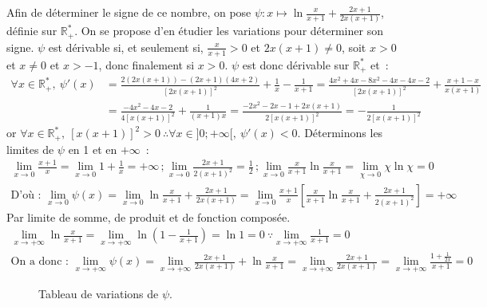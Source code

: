 \documentclass{article}
\begin{document}
  Afin de déterminer le signe de ce nombre, on pose $\psi:x\mapsto\ln\frac{x}{x+1}+\frac{2x+1}{2x(x+1)}$, définie sur $\mathbb{R}_+^*$. On se propose d'en étudier les variations pour déterminer son signe. $\psi$ est dérivable si, et seulement si, $\frac{x}{x+1}>0$ et $2x(x+1)\neq 0$, soit $x>0$ et $x\neq 0$ et $x>-1$, donc finalement si $x>0$. $\psi$ est donc dérivable sur $\mathbb{R}_+^*$ et~:
  \begin{align*}
    \forall x\in\mathbb{R}_+^*,\ \psi'(x)&=\frac{2(2x(x+1))-(2x+1)(4x+2)}{\left[2x(x+1)\right]^2}+\frac{1}{x}-\frac{1}{x+1}=\frac{4x^2+4x-8x^2-4x-4x-2}{\left[2x(x+1)\right]^2}+\frac{x+1-x}{x(x+1)} \\
    &=\frac{-4x^2-4x-2}{4\left[x(x+1)\right]^2}+\frac{1}{(x+1)x}=\frac{-2x^2-2x-1+2x(x+1)}{2\left[x(x+1)\right]^2}=-\frac{1}{2\left[x(x+1)\right]^2}
  \end{align*}
  or $\forall x\in\mathbb{R_+^*},\ \left[x(x+1)\right]^2>0\ \therefore \forall x\in]0;+\infty[,\ \psi'(x)<0$. Déterminons les limites de $\psi$ en 1 et en $+\infty$~:
  \begin{align*}
    \lim_{x\to 0}\frac{x+1}{x}=\lim_{x\to 0}1+\frac{1}{x}=+\infty\,; \lim_{x\to 0}\frac{2x+1}{2\left(x+1\right)^2}=\frac{1}{2}\,; \lim_{x\to 0}\frac{x}{x+1}\ln\frac{x}{x+1}=\lim_{\chi\to 0}\chi\ln \chi=0 \\
    \text{D'où~: } \lim_{x\to 0}\psi(x)=\lim_{x\to 0}\ln\frac{x}{x+1}+\frac{2x+1}{2x(x+1)}=\lim_{x\to 0}\frac{x+1}{x}\left[\frac{x}{x+1}\ln\frac{x}{x+1}+\frac{2x+1}{2\left(x+1\right)^2}\right]=+\infty
  \end{align*}
  Par limite de somme, de produit et de fonction composée.
  \begin{align*}
    \lim_{x\to+\infty}\ln\frac{x}{x+1}=\lim_{x\to+\infty}\ln\left(1-\frac{1}{x+1}\right)=\ln1=0\ \because\lim_{x\to+\infty}\frac{1}{x+1}=0 \\
    \text{On a donc~: }\lim_{x\to+\infty}\psi(x)=\lim_{x\to+\infty}\frac{2x+1}{2x(x+1)}+\ln\frac{x}{x+1}=\lim_{x\to+\infty}\frac{2x+1}{2x(x+1)}=\lim_{x\to+\infty}\frac{1+\frac{1}{2x}}{x+1}=0
  \end{align*}

  \begin{figure}[ht]
   \begin{center}
   \end{center}
   \caption{Tableau de variations de $\psi$.}
   \label{varpsi}
  \end{figure}
\end{document}
